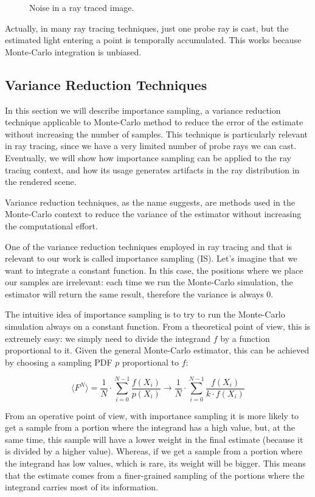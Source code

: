 \documentclass{PoliMi_MasterThesis}
\begin{document}
\begin{figure}[H]
{    }
	\caption{Noise in a ray traced image.}
    \label{fig:noise_example}
\end{figure}

Actually, in many ray tracing techniques, just one probe ray is cast, but the estimated light entering a point is temporally accumulated. This works because Monte-Carlo integration is unbiased.

\subsection{Variance Reduction Techniques}
In this section we will describe importance sampling, a variance reduction technique applicable to Monte-Carlo method to reduce the error of the estimate without increasing the number of samples. This technique is particularly relevant in ray tracing, since we have a very limited number of probe rays we can cast. Eventually, we will show how importance sampling can be applied to the ray tracing context, and how its usage generates artifacts in the ray distribution in the rendered scene.

Variance reduction techniques, as the name suggests, are methods used in the Monte-Carlo context to reduce the variance of the estimator without increasing the computational effort.

One of the variance reduction techniques employed in ray tracing and that is relevant to our work is called importance sampling (IS). Let's imagine that we want to integrate a constant function. In this case, the positions where we place our samples are irrelevant: each time we run the Monte-Carlo simulation, the estimator will return the same result, therefore the variance is always 0.

The intuitive idea of importance sampling is to try to run the Monte-Carlo simulation always on a constant function. From a theoretical point of view, this is extremely easy: we simply need to divide the integrand $\textit{f}$ by a function proportional to it. Given the general Monte-Carlo estimator, this can be achieved by choosing a sampling PDF $p$ proportional to $\textit{f}$:

$$\langle F^N \rangle = \frac{1}{N}\cdot\sum_{i=0}^{N-1}\frac{\textit{f}(X_i)}{p(X_i)} \longrightarrow \frac{1}{N}\cdot\sum_{i=0}^{N-1}\frac{\textit{f}(X_i)}{k\cdot \textit{f}(X_i)}$$

From an operative point of view, with importance sampling it is more likely to get a sample from a portion where the integrand has a high value, but, at the same time, this sample will have a lower weight in the final estimate (because it is divided by a higher value). Whereas, if we get a sample from a portion where the integrand has low values, which is rare, its weight will be bigger. This means that the estimate comes from a finer-grained sampling of the portions where the integrand carries most of its information.
\end{document}
